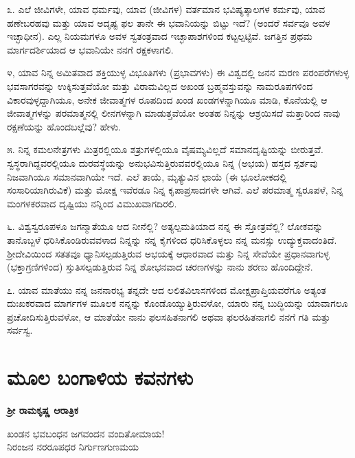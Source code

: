 ೩. ಎಲೆ ಜೀವಿಗಳೇ, ಯಾವ ಧರ್ಮವು, ಯಾವ (ಜೀವಿಗಳ) ವರ್ತಮಾನ ಭವಿಷ್ಯತ್ಕಾಲಗಳ ಕರ್ಮವು, ಯಾವ ಹಣೇಬರಹವು ಮತ್ತು ಯಾವ ಅದೃಷ್ಟ ಫಲ ತಾನೇ ಈ ಭವಾನಿಯನ್ನು ಬಿಟ್ಟು ಇದೆ? (ಅಂದರೆ ಸರ್ವವೂ ಅವಳ ಇಚ್ಛಾಧೀನ). ಎಲ್ಲ ನಿಯಮಗಳೂ ಅವಳ ಸ್ವತಂತ್ರವಾದ ಇಚ್ಛಾಪಾಶಗಳಿಂದ ಕಟ್ಟಲ್ಪಟ್ಟಿವೆ. ಜಗತ್ತಿನ ಪ್ರಥಮ ಮಾರ್ಗದರ್ಶಿಯಾದ ಆ ಭವಾನಿಯೇ ನನಗೆ ರಕ್ಷಕಳಾಗಲಿ.

೪, ಯಾವ ನಿನ್ನ ಅಮಿತವಾದ ಶಕ್ತಿಯುಳ್ಳ ವಿಭೂತಿಗಳು (ಪ್ರಭಾವಗಳು) ಈ ವಿಶ್ವದಲ್ಲಿ ಜನನ ಮರಣ ಪರಂಪರೆಗಳುಳ್ಳ ಭವಸಾಗರವನ್ನು ಉಕ್ಕಿಸುತ್ತವೆಯೋ ಮತ್ತು ವಿರಾಮವಿಲ್ಲದ ಅಖಂಡ ಬ್ರಹ್ಮವಸ್ತುವನ್ನು ನಾಮರೂಪಗಳಿಂದ ವಿಕಾರವುಳ್ಳದ್ದಾಗಿಯೂ, ಅನೇಕ ಜೀವಾತ್ಮಗಳ ರೂಪದಿಂದ ಖಂಡ ಖಂಡಗಳನ್ನಾಗಿಯೂ ಮಾಡಿ, ಕೊನೆಯಲ್ಲಿ ಆ ಜೀವಾತ್ಮಗಳನ್ನು ಪರಮಾತ್ಮನಲ್ಲಿ ಲೀನಗಳನ್ನಾಗಿ ಮಾಡುತ್ತವೆಯೋ ಅಂತಹ ನಿನ್ನನ್ನು ಆಶ್ರಯಿಸದೆ ಮತ್ತಾರಿಂದ ನಾವು ರಕ್ಷಣೆಯನ್ನು ಹೊಂದಬಲ್ಲೆವು? ಹೇಳು.

೫. ನಿನ್ನ ಕಮಲನೇತ್ರಗಳು ಮಿತ್ರರಲ್ಲಿಯೂ ಶತ್ರುಗಳಲ್ಲಿಯೂ ವೈಷಮ್ಯವಿಲ್ಲದೆ ಸಮಾನದೃಷ್ಟಿಯನ್ನು ಬೀರುತ್ತವೆ. ಸ್ವಸ್ಥರಾಗಿದ್ದವರಲ್ಲಿಯೂ ದುರವಸ್ಥೆಯನ್ನು ಅನುಭವಿಸುತ್ತಿರುವವರಲ್ಲಿಯೂ ನಿನ್ನ (ಅಭಯ) ಹಸ್ತದ ಸ್ಪರ್ಶವು ನಿಜವಾಗಿಯೂ ಸಮಾನವಾಗಿಯೇ ಇದೆ. ಎಲೆ ತಾಯೆ, ಮೃತ್ಯುವಿನ ಛಾಯೆ (ಈ ಭೂಲೋಕದಲ್ಲಿ ಸಂಸಾರಿಯಾಗಿರುವಿಕೆ) ಮತ್ತು ಮೋಕ್ಷ ಇವೆರಡೂ ನಿನ್ನ ಕೃಪಾಪ್ರಸಾದಗಳೇ ಆಗಿವೆ. ಎಲೆ ಪರಮಾತ್ಮ ಸ್ವರೂಪಳೆ, ನಿನ್ನ ಮಂಗಳಕರವಾದ ದೃಷ್ಟಿಯು ನನ್ನಿಂದ ವಿಮುಖವಾಗದಿರಲಿ.

೬. ವಿಶ್ವಸ್ವರೂಪಳೂ ಜಗನ್ಮಾತೆಯೂ ಆದ ನೀನೆಲ್ಲಿ? ಅತ್ಯಲ್ಪಮತಿಯಾದ ನನ್ನ ಈ ಸ್ತೋತ್ರವೆಲ್ಲಿ? ಲೋಕವನ್ನು ತಾನೊಬ್ಬಳೆ ಧರಿಸಿಕೊಂಡಿರುವವಳಾದ ನಿನ್ನನ್ನು ನನ್ನ ಕೈಗಳಿಂದ ಧರಿಸಿಕೊಳ್ಳಲು ನನ್ನ ಮನಸ್ಸು ಉದ್ಯುಕ್ತವಾದಂತಿದೆ. ಶ‍್ರೀದೇವಿಯಿಂದ ಸತತವೂ ಧ್ಯಾನಿಸಲ್ಪಡುತ್ತಿರುವ ಅಭಯಕ್ಕೆ ಆಧಾರವಾದ ಮತ್ತು ನಿನ್ನ ಸೇವೆಯೇ ಪ್ರಧಾನವಾಗುಳ್ಳ (ಭಕ್ತಾಗ್ರಣಿಗಳಿಂದ) ಸ್ತುತಿಸಲ್ಪಡುತ್ತಿರುವ ನಿನ್ನ ಶೋಭನವಾದ ಚರಣಗಳನ್ನು ನಾನು ಶರಣು ಹೊಂದಿದ್ದೇನೆ.

೭. ಯಾವ ಮಾತೆಯು ನನ್ನ ಜನನಾರಭ್ಯ ತನ್ನದೇ ಆದ ಲಲಿತವಿಲಾಸಗಳಿಂದ ಮೋಕ್ಷಪ್ರಾಪ್ತಿಯವರೆಗೂ ಅತ್ಯಂತ ದುಃಖಕರವಾದ ಮಾರ್ಗಗಳ ಮೂಲಕ ನನ್ನನ್ನು ಕೊಂಡೊಯ್ಯುತ್ತಿರುವಳೋ, ಯಾರು ನನ್ನ ಬುದ್ಧಿಯನ್ನು ಯಾವಾಗಲೂ ಪ್ರಚೋದಿಸುತ್ತಿರುವಳೋ, ಆ ಮಾತೆಯೇ ನಾನು ಫಲಸಹಿತನಾಗಲಿ ಅಥವಾ ಫಲರಹಿತನಾಗಲಿ ನನಗೆ ಗತಿ ಮತ್ತು ಸರ್ವಸ್ವ.

\chapter[ಮೂಲ ಬಂಗಾಳಿಯ ಕವನಗಳು]{ಮೂಲ ಬಂಗಾಳಿಯ ಕವನಗಳು}

\begin{center}
\textbf{ಶ‍್ರೀ ರಾಮಕೃಷ್ಣ ಆರಾತ್ರಿಕ}
\end{center}

\begin{myquote}
ಖಂಡನ ಭವಬಂಧನ ಜಗವಂದನ ವಂದಿತೋಮಾಯ!\\ನಿರಂಜನ ನರರೂಪಧರ ನಿರ್ಗುಣಗುಣಮಯ
\end{myquote}


